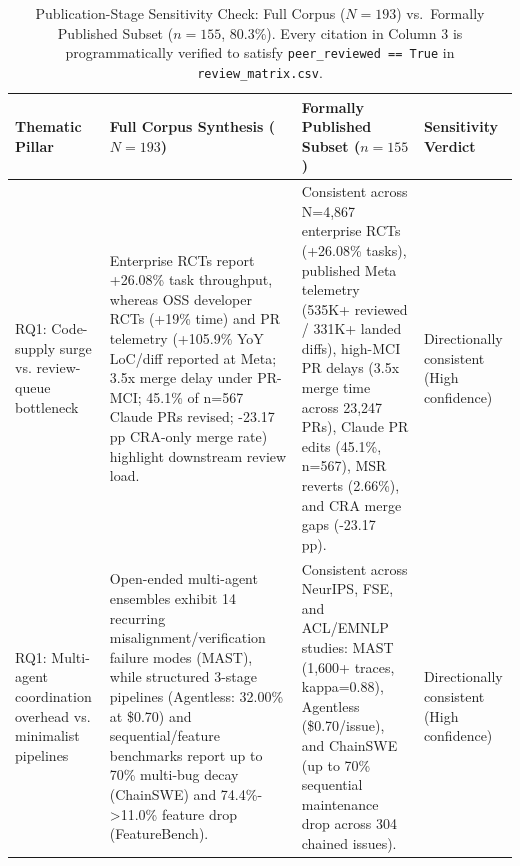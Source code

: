\documentclass[10pt,twocolumn,a4paper]{article}
\begin{document}
\begin{table}[t!]
\centering
\caption{Publication-Stage Sensitivity Check: Full Corpus ($N = 193$) vs.\ Formally Published Subset ($n = 155$, 80.3\%). Every citation in Column 3 is programmatically verified to satisfy \texttt{peer\_reviewed == True} in \texttt{review\_matrix.csv}.}
\label{tab:sensitivity}
\scriptsize
\setlength{\tabcolsep}{3.8pt}
\begin{tabularx}{\textwidth}{>{\raggedright\arraybackslash}p{2.75cm} X X >{\raggedright\arraybackslash}p{2.45cm}}
\toprule
\textbf{Thematic Pillar} & \textbf{Full Corpus Synthesis ($N = 193$)} & \textbf{Formally Published Subset ($n = 155$)} & \textbf{Sensitivity Verdict} \\
\midrule
RQ1: Code-supply surge vs. review-queue bottleneck & Enterprise RCTs report +26.08\% task throughput, whereas OSS developer RCTs (+19\% time) and PR telemetry (+105.9\% YoY LoC/diff reported at Meta; 3.5x merge delay under PR-MCI; 45.1\% of n=567 Claude PRs revised; -23.17 pp CRA-only merge rate) highlight downstream review load.~\cite{cui2026effects,becker2025measuring,adams2026automating,gong2026analyzing,watanabe2025use,oukhay2026code,chowdhury2026industry} & Consistent across N=4,867 enterprise RCTs (+26.08\% tasks), published Meta telemetry (535K+ reviewed / 331K+ landed diffs), high-MCI PR delays (3.5x merge time across 23,247 PRs), Claude PR edits (45.1\%, n=567), MSR reverts (2.66\%), and CRA merge gaps (-23.17 pp).~\cite{cui2026effects,adams2026automating,gong2026analyzing,watanabe2025use,oukhay2026code,chowdhury2026industry} & Directionally consistent (High confidence) \\
RQ1: Multi-agent coordination overhead vs. minimalist pipelines & Open-ended multi-agent ensembles exhibit 14 recurring misalignment/verification failure modes (MAST), while structured 3-stage pipelines (Agentless: 32.00\% at \$0.70) and sequential/feature benchmarks report up to 70\% multi-bug decay (ChainSWE) and 74.4\%->11.0\% feature drop (FeatureBench).~\cite{cemri2025multiagent,xia2024demystifying,jin2026chainswe,zhou2026featurebench} & Consistent across NeurIPS, FSE, and ACL/EMNLP studies: MAST (1,600+ traces, kappa=0.88), Agentless (\$0.70/issue), and ChainSWE (up to 70\% sequential maintenance drop across 304 chained issues).~\cite{cemri2025multiagent,xia2024demystifying,jin2026chainswe} & Directionally consistent (High confidence) \\

\end{tabularx}
\end{table}
\end{document}
